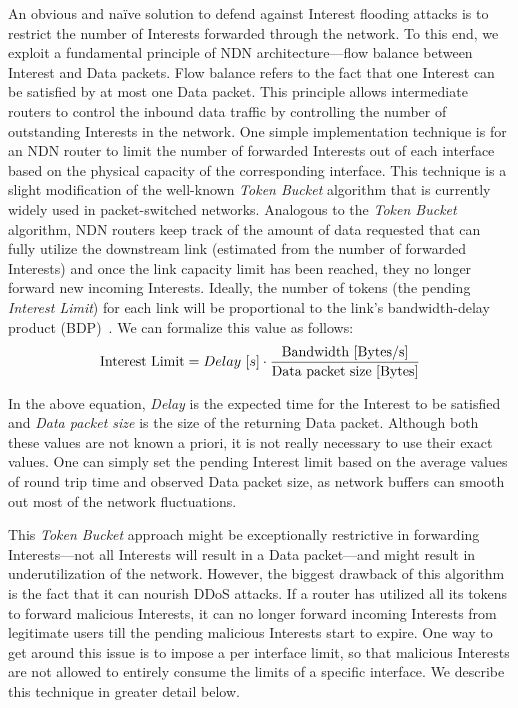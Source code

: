 \documentclass[10pt,conference]{IEEEtran}
\begin{document}

An obvious and na\"ive solution to defend against Interest flooding attacks is to restrict the number of Interests forwarded through the network. To this end, we exploit a 
 fundamental principle of NDN architecture---flow balance between Interest and Data packets. Flow balance refers to the fact that one Interest can be satisfied by at most one Data packet. This principle allows intermediate routers to control the inbound data traffic by controlling the number of outstanding Interests in the network. 
One simple implementation technique  is for an NDN router to limit the number of forwarded Interests out of each interface based on the physical capacity of the corresponding interface. This technique is a slight modification of the well-known {\it Token Bucket} algorithm that is currently widely used in packet-switched networks. Analogous to the {\it Token Bucket} algorithm, NDN routers keep track of the amount of data requested that can fully utilize the downstream link (estimated from the number of forwarded Interests) and once the link capacity limit has been reached, they no longer forward new incoming Interests. Ideally, the number of tokens (the pending \emph{Interest Limit}) for each link will be proportional to the link's bandwidth-delay product (BDP)~\cite{tcp-survey}. We can formalize this value as follows:
%
\begin{equation}
\label{eq:interest limit}
\small \mathrm{Interest\ Limit} = Delay\ [s] \cdot \frac{\mathrm{Bandwidth\ [Bytes/s]}}{\mathrm{Data\ packet\ size\ [Bytes]}}
\end{equation}

In the above equation, \emph{Delay} is the expected time for the Interest to be satisfied and \emph{Data packet size} is the size of the returning Data packet.
Although both these values are not known a priori, it is not really necessary to use their exact values.
One can simply set the pending Interest limit based on the average values of round trip time and observed Data packet size, as network buffers can smooth out most of the network fluctuations.

This {\it Token Bucket} approach might be exceptionally restrictive in forwarding Interests---not all Interests will result in a Data packet---and might result in underutilization of the network. However, the biggest drawback of this algorithm is the fact that it can nourish DDoS attacks. If a router has utilized all its tokens to forward malicious Interests, it can no longer forward incoming Interests from legitimate users till the pending malicious Interests start to expire. One way to get around this issue is to impose a per interface limit, so that malicious Interests are not allowed to entirely consume the limits of a specific interface. We describe this technique in greater detail below.
\end{document}

